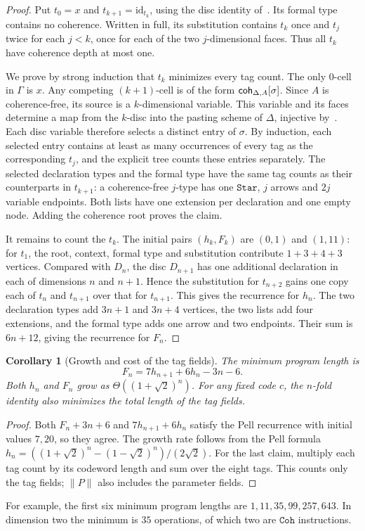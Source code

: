 \documentclass{article}%
\theoremstyle{remark}
\theoremstyle{definition}
\theoremstyle{definition}
\theoremstyle{plain}
\newtheorem{corollary}[theorem]{Corollary}
\begin{document}
\begin{proof}
Put \(t_0=x\) and \(t_{k+1}=\mathrm{id}_{t_k}\), using the disc
identity of~\cite[Definitions~2.3--2.4]{Beyond_eh}. Its formal
type contains no coherence. Written in full, its substitution
contains \(t_k\) once and \(t_j\) twice for each \(j<k\), once
for each of the two \(j\)-dimensional faces. Thus all \(t_k\)
have coherence depth at most one.

We prove by strong induction that \(t_k\) minimizes every tag
count. The only \(0\)-cell in \(\Gamma\) is \(x\). Any competing
\((k+1)\)-cell is of the form \(\mathsf{coh}_{\Delta,A}[\sigma]\).
Since \(A\) is coherence-free, its source is a \(k\)-dimensional
variable. This variable and its faces determine a map from the
\(k\)-disc into the pasting scheme of \(\Delta\), injective
by~\cite[Lemma~29]{finster_typetheoretical_2017}. Each disc
variable therefore selects a distinct entry of \(\sigma\).
By induction, each selected entry contains at least as many
occurrences of every tag as the corresponding \(t_j\), and the
explicit tree counts these entries separately. The selected
declaration types and the formal type have the same tag counts
as their counterparts in \(t_{k+1}\): a coherence-free \(j\)-type
has one \(\mathtt{Star}\), \(j\) arrows and \(2j\) variable
endpoints. Both lists have one extension per declaration and one
empty node. Adding the coherence root proves the claim.

It remains to count the \(t_k\). The initial pairs \((h_k,F_k)\)
are \((0,1)\) and \((1,11)\): for \(t_1\), the root, context,
formal type and substitution contribute \(1+3+4+3\) vertices.
Compared with \(D_n\), the disc \(D_{n+1}\) has one additional
declaration in each of dimensions \(n\) and \(n+1\). Hence the
substitution for \(t_{n+2}\) gains one copy each of \(t_n\) and
\(t_{n+1}\) over that for \(t_{n+1}\). This gives the recurrence
for \(h_n\). The two declaration types add \(3n+1\) and \(3n+4\)
vertices, the two lists add four extensions, and the formal type
adds one arrow and two endpoints. Their sum is \(6n+12\), giving
the recurrence for \(F_n\).
\end{proof}

\begin{corollary}[Growth and cost of the tag fields]
The minimum program length is
\[
 F_n=7h_{n+1}+6h_n-3n-6.
\]
Both \(h_n\) and \(F_n\) grow as \(\Theta((1+\sqrt{2})^n)\).
For any fixed code \(c\), the \(n\)-fold identity also minimizes
the total length of the tag fields.
\end{corollary}

\begin{proof}
Both \(F_n+3n+6\) and \(7h_{n+1}+6h_n\) satisfy the Pell recurrence
with initial values \(7,20\), so they agree. The growth rate follows
from the Pell formula
\(h_n=((1+\sqrt{2})^n-(1-\sqrt{2})^n)/(2\sqrt{2})\).
For the last claim, multiply each tag count by its codeword length
and sum over the eight tags. This counts only the tag fields;
\(\|P\|\) also includes the parameter fields.
\end{proof}

For example, the first six minimum program lengths are
\(1,11,35,99,257,643\). In dimension two the minimum is \(35\)
operations, of which two are \(\mathtt{Coh}\) instructions.
\end{document}
